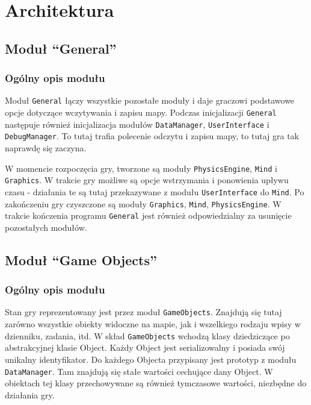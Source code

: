 \documentclass[licencjacka]{pracamgr}
\begin{document}
\chapter{Architektura}
  \section{Moduł ``General''}
    \subsection{Ogólny opis modułu}
      Moduł \texttt{General} łączy wszystkie pozostałe moduły i daje graczowi podstawowe opcje dotyczące wczytywania i zapisu
      mapy. Podczas inicjalizacji \texttt{General} następuje również inicjalizacja modułów \texttt{DataManager}, \texttt{UserInterface} i
      \texttt{DebugManager}. To tutaj trafia polecenie odczytu i zapisu mapy, to tutaj gra tak naprawdę się zaczyna.

      W momencie rozpoczęcia gry, tworzone są moduły \texttt{PhysicsEngine}, \texttt{Mind} i \texttt{Graphics}. W trakcie gry możliwe są
      opcje wstrzymania i ponowienia upływu czasu - działania te są tutaj przekazywane z modułu \texttt{UserInterface} do
      \texttt{Mind}. Po zakończeniu gry czyszczone są moduły \texttt{Graphics}, \texttt{Mind}, \texttt{PhysicsEngine}. W trakcie kończenia programu
      \texttt{General} jest również odpowiedzialny za usunięcie pozostałych modułów.

  \section{Moduł ``Game Objects''}
    \subsection{Ogólny opis modułu}
      Stan gry reprezentowany jest przez moduł \texttt{GameObjects}. Znajdują się tutaj zarówno wszystkie obiekty widoczne na
      mapie, jak i wszelkiego rodzaju wpisy w dzienniku, zadania, itd. W skład \texttt{GameObjects} wchodzą klasy
      dziedziczące po abstrakcyjnej klasie Object. Każdy Object jest serializowalny i posiada swój unikalny
      identyfikator. Do każdego Objecta przypisany jest prototyp z modułu \texttt{DataManager}. Tam znajdują się stałe
      wartości cechujące dany Object. W obiektach tej klasy przechowywane są również tymczasowe wartości, niezbędne
      do działania gry.
\end{document}
